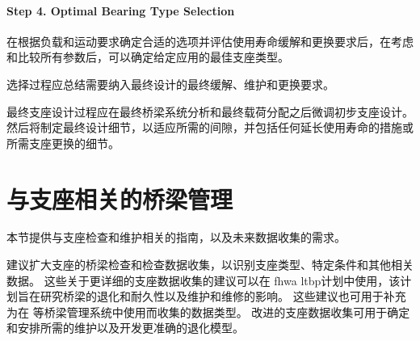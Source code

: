 \paragraph*{Step 4. Optimal Bearing Type Selection}
在根据负载和运动要求确定合适的选项并评估使用寿命缓解和更换要求后，在考虑和比较所有参数后，可以确定给定应用的最佳支座类型。

选择过程应总结需要纳入最终设计的最终缓解、维护和更换要求。

最终支座设计过程应在最终桥梁系统分析和最终载荷分配之后微调初步支座设计。 然后将制定最终设计细节，以适应所需的间隙，并包括任何延长使用寿命的措施或所需支座更换的细节。

\section{与支座相关的桥梁管理}
本节提供与支座检查和维护相关的指南，以及未来数据收集的需求。

建议扩大支座的桥梁检查和检查数据收集，以识别支座类型、特定条件和其他相关数据。 这些关于更详细的支座数据收集的建议可以在 \acrshort{fhwa} \acrfull{ltbp}计划中使用，该计划旨在研究桥梁的退化和耐久性以及维护和维修的影响。 这些建议也可用于补充为在 \pontis 等桥梁管理系统中使用而收集的数据类型。 改进的支座数据收集可用于确定和安排所需的维护以及开发更准确的退化模型。

